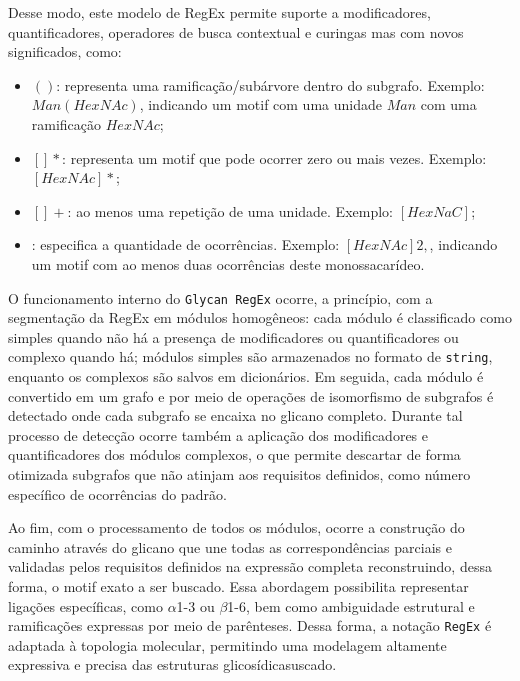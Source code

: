 Desse modo, este modelo de RegEx permite suporte a modificadores,
quantificadores, operadores de busca contextual e curingas mas com novos
significados, como:
\begin{itemize}
	\item $()$: representa uma ramificação/subárvore dentro do subgrafo. Exemplo: $Man(HexNAc)$, indicando um motif com uma unidade $Man$ com uma ramificação $HexNAc$;
	\item $[]*$: representa um motif que pode ocorrer zero ou mais vezes. Exemplo: $[HexNAc]*$;
	\item $[]+$: ao menos uma repetição de uma unidade. Exemplo: $[HexNaC]$;
	\item ${}$: especifica a quantidade de ocorrências. Exemplo: $[HexNAc]{2,}$, indicando um motif com ao menos duas ocorrências deste monossacarídeo.
\end{itemize}


O funcionamento interno do \texttt{Glycan RegEx} ocorre, a princípio, com a
segmentação da RegEx em módulos homogêneos: cada módulo é classificado como
simples quando não há a presença de modificadores ou quantificadores ou
complexo quando há; módulos simples são armazenados no formato de
\texttt{string}, enquanto os complexos são salvos em dicionários. Em seguida,
cada módulo é convertido em um grafo e por meio de operações de isomorfismo de
subgrafos é detectado onde cada subgrafo se encaixa no glicano completo.
Durante tal processo de detecção ocorre também a aplicação dos modificadores e
quantificadores dos módulos complexos, o que permite descartar de forma
otimizada subgrafos que não atinjam aos requisitos definidos, como número
específico de ocorrências do padrão.

Ao fim, com o processamento de todos os módulos, ocorre a construção do caminho
através do glicano que une todas as correspondências parciais e validadas pelos
requisitos definidos na expressão completa reconstruindo, dessa forma, o motif
exato a ser buscado. Essa abordagem possibilita representar ligações
específicas, como $\alpha$1-3 ou $\beta$1-6, bem como ambiguidade estrutural e
ramificações expressas por meio de parênteses. Dessa forma, a notação
\texttt{RegEx} é adaptada à topologia molecular, permitindo uma modelagem
altamente expressiva e precisa das estruturas glicosídicasuscado.

